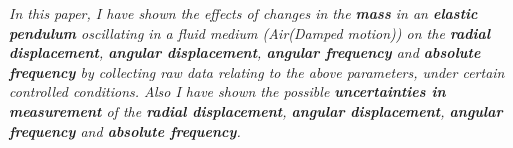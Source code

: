 \textit{In this paper, I have shown the effects of changes in the \textbf{mass} in an \textbf{elastic pendulum} oscillating in a fluid medium (Air(Damped motion)) on the \textbf{radial displacement}, \textbf{angular displacement}, \textbf{angular frequency} and \textbf{absolute frequency} by collecting raw data relating to the above parameters, under certain controlled conditions. Also I have shown the possible \textbf{uncertainties in measurement} of the \textbf{radial displacement}, \textbf{angular displacement}, \textbf{angular frequency} and \textbf{absolute frequency}.}
